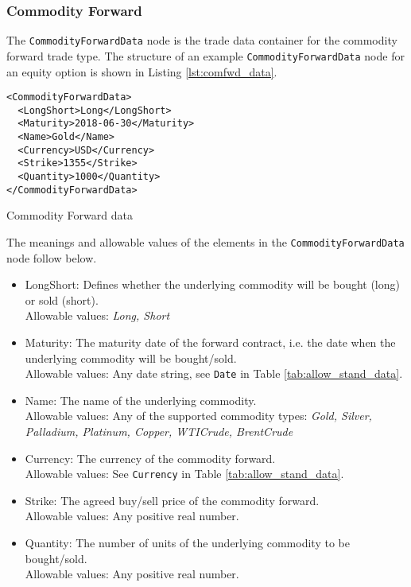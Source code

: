 \subsubsection{Commodity Forward}

The \lstinline!CommodityForwardData!  node is the trade data container for the commodity forward trade type.   The structure of an example \lstinline!CommodityForwardData! node for an equity option is shown in 
Listing \ref{lst:comfwd_data}.

\begin{listing}[H]
\begin{verbatim}
<CommodityForwardData>
  <LongShort>Long</LongShort>
  <Maturity>2018-06-30</Maturity>
  <Name>Gold</Name>
  <Currency>USD</Currency>
  <Strike>1355</Strike>
  <Quantity>1000</Quantity>
</CommodityForwardData>
\end{verbatim}
\caption{Commodity Forward data}
\label{lst:comfwd_data}
\end{listing}

The meanings and allowable values of the elements in the \lstinline!CommodityForwardData!  node follow below.

\begin{itemize}
	\item LongShort: Defines whether the underlying commodity will be bought (long) or sold (short). \\
	Allowable values: \emph{Long, Short}
	\item Maturity: The maturity date of the forward contract, i.e. the date when the underlying commodity will be bought/sold. \\
	Allowable values: Any date string, see  \lstinline!Date! in Table \ref{tab:allow_stand_data}.
	\item Name: The name of the underlying commodity. \\
	Allowable values:  Any of the supported commodity types:  \emph{Gold, Silver, Palladium, Platinum, Copper, WTICrude, BrentCrude}
	\item Currency: The  currency of the commodity forward. \\
	Allowable values:  See \lstinline!Currency! in Table \ref{tab:allow_stand_data}.	
	\item Strike: The agreed buy/sell price of the commodity forward. \\
	Allowable values:  Any positive real number.	
	\item Quantity: The number of units of the underlying commodity to be bought/sold. \\
	Allowable values:  Any positive real number.
\end{itemize}